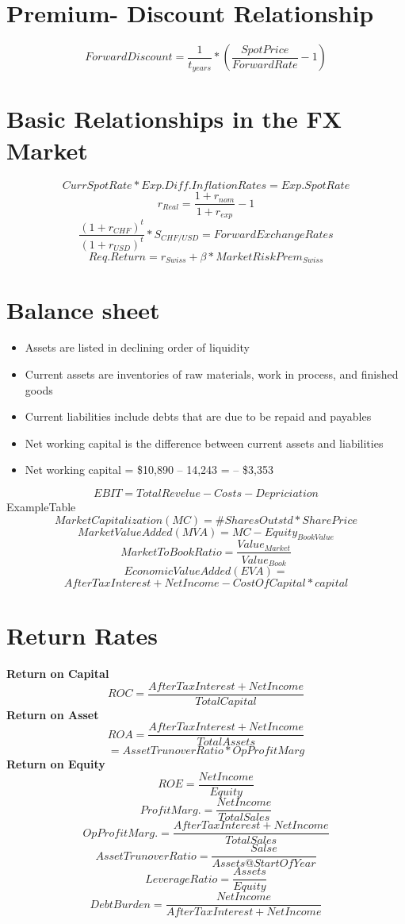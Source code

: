 \documentclass{cheatsheet}
\begin{document}
\section*{Premium- Discount Relationship}
\[ForwardDiscount = \frac{1}{t_{years}} * (\frac{SpotPrice}{ForwardRate} - 1)\]
\section*{Basic Relationships
in the FX Market}
\vspace{30mm}
\[CurrSpotRate * Exp.Diff.InflationRates = Exp.SpotRate\]
\[r_{Real} = \frac{1+r_{nom}}{1+r_{exp}}-1\]
\[\frac{(1+r_{CHF})^t}{(1+r_{USD})^t}*S_{CHF/USD} = ForwardExchangeRates\]
\[Req.Return = r_{Swiss} + \beta * MarketRiskPrem_{Swiss}\]
\section*{Balance sheet}
\begin{itemize}
  \item Assets are listed in declining order of liquidity
  \item Current assets are inventories of raw materials, work in process, and finished goods
  \item Current liabilities include debts that are due to be repaid and payables
  \item Net working capital is the difference between current assets and liabilities
  \item Net working capital = \$10,890 -- 14,243 = -- \$3,353
\end{itemize}

\[EBIT = TotalRevelue - Costs - Depriciation\]
\vspace{30mm}
ExampleTable
\[MarketCapitalization(MC) = \#SharesOutstd * SharePrice\]
\[MarketValueAdded(MVA) = MC - Equity_{BookValue}\]
\[MarketToBookRatio = \frac{Value_{Market}}{Value_{Book}}\]
\[EconomicValueAdded(EVA) = \]
\[AfterTaxInterest + NetIncome - Cost Of Capital * capital \]
\section{Return Rates}
\textbf{Return on Capital}
\[ROC = \frac{AfterTaxInterest + NetIncome}{TotalCapital}\]
\textbf{Return on Asset}
\[ROA = \frac{AfterTaxInterest + NetIncome}{TotalAssets}\]
\[= AssetTrunoverRatio * OpProfitMarg\]
\textbf{Return on Equity}
\[ROE = \frac{NetIncome}{Equity}\]
\[ProfitMarg. = \frac{NetIncome}{TotalSales}\]
\[OpProfitMarg. = \frac{AfterTaxInterest + NetIncome}{TotalSales}\]
\[AssetTrunoverRatio = \frac{Salse}{Assets@StartOfYear}\]
\[LeverageRatio = \frac{Assets}{Equity}\]
\[DebtBurden = \frac{NetIncome}{AfterTaxInterest + NetIncome}\]
\end{document}
